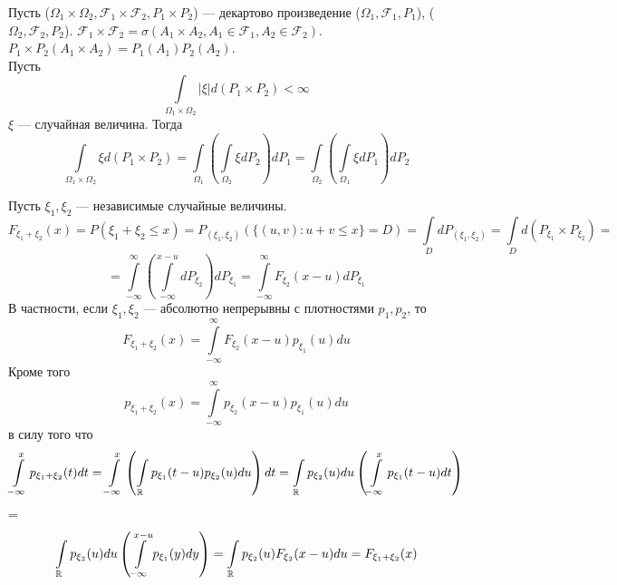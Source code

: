 \begin{theorem}[Фубини]
Пусть ($\Omega_1 \times \Omega_2, \mathcal{F}_1\times\mathcal{F}_2, P_1\times P_2$) --- декартово произведение ($\Omega_1, \mathcal{F}_1, P_1$), ($\Omega_2, \mathcal{F}_2, P_2$). $\mathcal{F}_1\times\mathcal{F}_2 = \sigma(A_1\times A_2, A_1 \in \mathcal{F}_1, A_2 \in \mathcal{F}_2)$. $P_1\times P_2 (A_1\times A_2) = P_1(A_1)P_2(A_2)$. \\ 
Пусть $$\int\limits_{\Omega_1 \times\Omega_2} |\xi|d(P_1 \times P_2) < \infty$$ $\xi$ --- случайная величина. Тогда
$$\int\limits_{\Omega_1 \times\Omega_2} \xi d\left(P_1 \times P_2\right) = \int\limits_{\Omega_1}\left(\int\limits_{\Omega_2} \xi dP_2\right) dP_1 = \int\limits_{\Omega_2}\left(\int\limits_{\Omega_1} \xi d P_1\right) dP_2$$
\end{theorem}
\begin{theorem}[Свёртка]
\end{theorem}
Пусть $\xi_1, \xi_2$ --- независимые случайные величины.
 $$F_{\xi_1 + \xi_2}(x) = P(\xi_1 + \xi_2 \leqslant x) = P_{(\xi_1, \xi_2)}(\{(u,v): u+v \leqslant x\} = D) = \int\limits_{D}dP_{(\xi_1, \xi_2)} = \int\limits_{D}d(P_{\xi_1} \times P_{\xi_2}) =$$
 $$= \int\limits_{-\infty}^{\infty}\left(\int\limits_{-\infty}^{x-u}d P_{\xi_2}\right)d P_{\xi_1} =  \int\limits_{-\infty}^{\infty}F_{\xi_2}(x-u)d P_{\xi_1}$$ 
В частности, если  $\xi_1, \xi_2 $ --- абсолютно непрерывны с плотностями $p_1, p_2$, то $$F_{\xi_1 + \xi_2}(x) = \int\limits_{-\infty}^{\infty}F_{\xi_2}(x-u) p_{\xi_1}(u)du$$
Кроме того $$p_{\xi_1 + \xi_2}(x) = \int\limits_{-\infty}^{\infty}p_{\xi_2}(x-u)p_{\xi_1}(u)du$$ в силу того что
$$\int\limits_{-\infty}^{x} p_{\xi_1 + \xi_2}(t) dt = \int\limits_{-\infty}^{x}\left(\int\limits_{\mathbb{R}} p_{\xi_1}(t-u)p_{\xi_2}(u)du\right)dt = \int\limits_{\mathbb{R}}p_{\xi_2}(u)du\left( \int\limits_{-\infty}^{x}p_{\xi_1}(t-u) dt\right)$$ = $$\int\limits_{\mathbb{R}}p_{\xi_2}(u)du\left( \int\limits_{-\infty}^{x-u}p_{\xi_1}(y) dy\right) = \int\limits_{\mathbb{R}}p_{\xi_2}(u)F_{\xi_2}(x-u)du = F_{\xi_1 + \xi_2}(x)$$